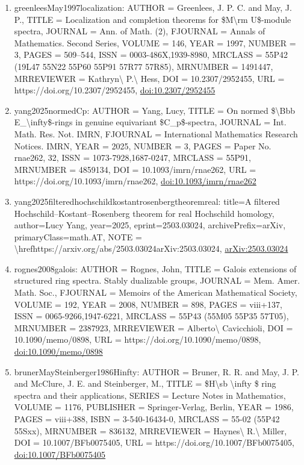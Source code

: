 \documentclass[11pt]{article}
\begin{document}
\begin{enumerate}[leftmargin=*]
  \item greenleesMay1997localization: AUTHOR = Greenlees, J. P. C. and May, J. P., TITLE = Localization and completion theorems for \$M\textbackslash{}rm U\$-module spectra, JOURNAL = Ann. of Math. (2), FJOURNAL = Annals of Mathematics. Second Series, VOLUME = 146, YEAR = 1997, NUMBER = 3, PAGES = 509--544, ISSN = 0003-486X,1939-8980, MRCLASS = 55P42 (19L47 55N22 55P60 55P91 57R77 57R85), MRNUMBER = 1491447, MRREVIEWER = Kathryn\textbackslash{} P.\textbackslash{} Hess, DOI = 10.2307/2952455, URL = https://doi.org/10.2307/2952455, \href{https://doi.org/10.2307/2952455}{doi:10.2307/2952455}
  \item yang2025normedCp: AUTHOR = Yang, Lucy, TITLE = On normed \$\textbackslash{}Bbb E\_\textbackslash{}infty\$-rings in genuine equivariant \$C\_p\$-spectra, JOURNAL = Int. Math. Res. Not. IMRN, FJOURNAL = International Mathematics Research Notices. IMRN, YEAR = 2025, NUMBER = 3, PAGES = Paper No. rnae262, 32, ISSN = 1073-7928,1687-0247, MRCLASS = 55P91, MRNUMBER = 4859134, DOI = 10.1093/imrn/rnae262, URL = https://doi.org/10.1093/imrn/rnae262, \href{https://doi.org/10.1093/imrn/rnae262}{doi:10.1093/imrn/rnae262}
  \item yang2025filteredhochschildkostantrosenbergtheoremreal: title=A filtered Hochschild--Kostant--Rosenberg theorem for real Hochschild homology, author=Lucy Yang, year=2025, eprint=2503.03024, archivePrefix=arXiv, primaryClass=math.AT, NOTE = \textbackslash{}hrefhttps://arxiv.org/abs/2503.03024arXiv:2503.03024, \href{https://arxiv.org/abs/2503.03024}{arXiv:2503.03024}
  \item rognes2008galois: AUTHOR = Rognes, John, TITLE = Galois extensions of structured ring spectra. Stably dualizable groups, JOURNAL = Mem. Amer. Math. Soc., FJOURNAL = Memoirs of the American Mathematical Society, VOLUME = 192, YEAR = 2008, NUMBER = 898, PAGES = viii+137, ISSN = 0065-9266,1947-6221, MRCLASS = 55P43 (55M05 55P35 57T05), MRNUMBER = 2387923, MRREVIEWER = Alberto\textbackslash{} Cavicchioli, DOI = 10.1090/memo/0898, URL = https://doi.org/10.1090/memo/0898, \href{https://doi.org/10.1090/memo/0898}{doi:10.1090/memo/0898}
  \item brunerMaySteinberger1986Hinfty: AUTHOR = Bruner, R. R. and May, J. P. and McClure, J. E. and Steinberger, M., TITLE = \$H\textbackslash{}sb \textbackslash{}infty \$ ring spectra and their applications, SERIES = Lecture Notes in Mathematics, VOLUME = 1176, PUBLISHER = Springer-Verlag, Berlin, YEAR = 1986, PAGES = viii+388, ISBN = 3-540-16434-0, MRCLASS = 55-02 (55P42 55Sxx), MRNUMBER = 836132, MRREVIEWER = Haynes\textbackslash{} R.\textbackslash{} Miller, DOI = 10.1007/BFb0075405, URL = https://doi.org/10.1007/BFb0075405, \href{https://doi.org/10.1007/BFb0075405}{doi:10.1007/BFb0075405}

\end{enumerate}
\end{document}

